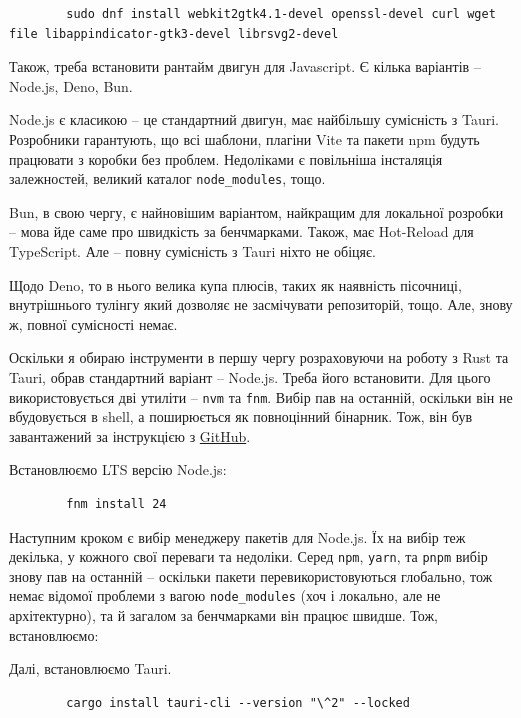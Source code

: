 \documentclass[14pt, a4paper]{extreport}
\begin{document}
	\begin{verbatim}
		sudo dnf install webkit2gtk4.1-devel openssl-devel curl wget file libappindicator-gtk3-devel librsvg2-devel
	\end{verbatim}
	
	Також, треба встановити рантайм двигун для Javascript. Є кілька варіантів -- Node.js, Deno, Bun. 
	
	Node.js є класикою -- це стандартний двигун, має найбільшу сумісність з Tauri. Розробники гарантують, що всі шаблони, плагіни Vite та пакети npm будуть працювати з коробки без проблем. Недоліками є повільніша інсталяція залежностей, великий каталог \texttt{node\_modules}, тощо.
	
	Bun, в свою чергу, є найновішим варіантом, найкращим для локальної розробки -- мова йде саме про швидкість за бенчмарками. Також, має Hot-Reload для TypeScript. Але -- повну сумісність з Tauri ніхто не обіцяє.
	
	Щодо Deno, то в нього велика купа плюсів, таких як наявність пісочниці, внутрішнього тулінгу який дозволяє не засмічувати репозиторій, тощо. Але, знову ж, повної сумісності немає.
	
	Оскільки я обираю інструменти в першу чергу розраховуючи на роботу з Rust та Tauri, обрав стандартний варіант -- Node.js. Треба його встановити. Для цього використовується дві утиліти -- \texttt{nvm} та \texttt{fnm}. Вибір пав на останній, оскільки він не вбудовується в shell, а поширюється як повноцінний бінарник. Тож, він був завантажений за інструкцією з \href{https://github.com/schniz/fnm#using-a-script-macoslinux}{GitHub}.
	
	Встановлюємо LTS версію Node.js:
	
	\begin{verbatim}
		fnm install 24
	\end{verbatim}
	
	Наступним кроком є вибір менеджеру пакетів для Node.js. Їх на вибір теж декілька, у кожного свої переваги та недоліки. Серед \texttt{npm}, \texttt{yarn}, та \texttt{pnpm} вибір знову пав на останній -- оскільки пакети перевикористовуються глобально, тож немає відомої проблеми з вагою \texttt{node\_modules} (хоч і локально, але не архітектурно), та й загалом за бенчмарками він працює швидше. Тож, встановлюємо:
	
	
	Далі, встановлюємо Tauri.
	
	\begin{verbatim}
		cargo install tauri-cli --version "\^2" --locked
	\end{verbatim}
	
\end{document}

